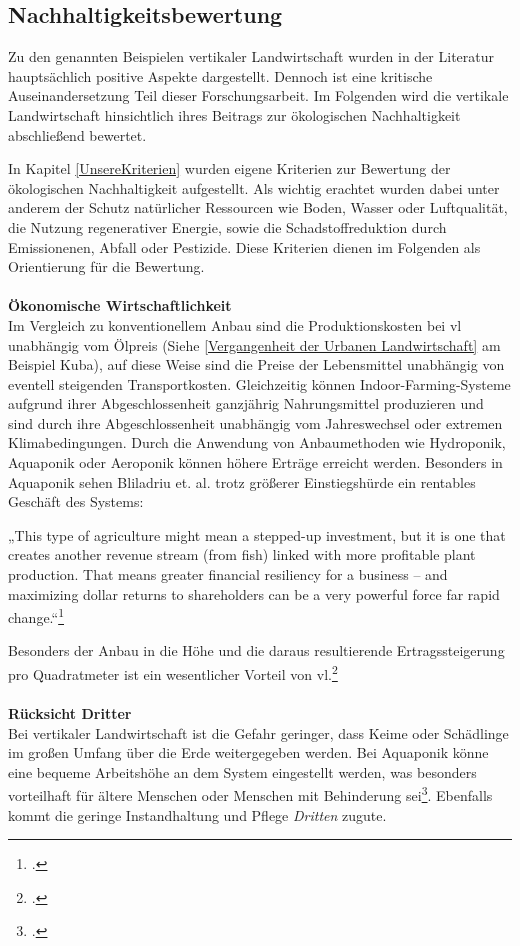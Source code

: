 \documentclass{scrartcl}
\begin{document}
\subsection{Nachhaltigkeitsbewertung}
Zu den genannten Beispielen vertikaler Landwirtschaft wurden in der Literatur hauptsächlich positive Aspekte dargestellt. Dennoch ist eine kritische Auseinandersetzung Teil dieser Forschungsarbeit. Im Folgenden wird die vertikale Landwirtschaft hinsichtlich ihres Beitrags zur ökologischen Nachhaltigkeit abschließend bewertet.

In Kapitel \ref{UnsereKriterien} wurden eigene Kriterien zur Bewertung der ökologischen Nachhaltigkeit aufgestellt. Als wichtig erachtet wurden dabei unter anderem der Schutz natürlicher Ressourcen wie Boden, Wasser oder Luftqualität, die Nutzung regenerativer Energie, sowie die Schadstoffreduktion durch Emissionenen, Abfall oder Pestizide. Diese Kriterien dienen im Folgenden als Orientierung für die Bewertung.
\\
\\
\textbf{Ökonomische Wirtschaftlichkeit}\\
Im Vergleich zu konventionellem Anbau sind die Produktionskosten bei \acs{vl} unabhängig vom Ölpreis (Siehe \ref{Vergangenheit der Urbanen Landwirtschaft} am Beispiel Kuba), auf diese Weise sind die Preise der Lebensmittel unabhängig von eventell steigenden Transportkosten. Gleichzeitig können Indoor-Farming-Systeme aufgrund ihrer Abgeschlossenheit ganzjährig Nahrungsmittel produzieren und sind durch ihre Abgeschlossenheit unabhängig vom Jahreswechsel oder extremen Klimabedingungen. Durch die Anwendung von Anbaumethoden wie Hydroponik, Aquaponik oder Aeroponik können höhere Erträge erreicht werden. Besonders in Aquaponik sehen Bliladriu et. al. trotz größerer Einstiegshürde ein rentables Geschäft des Systems:
\begin{displayquote}
„This type of agriculture might mean a stepped-up investment, but it is one that creates another revenue stream (from fish) linked with more profitable plant production. That means greater financial resiliency for a business – and maximizing dollar returns to shareholders can be a very powerful force far rapid change.“\footcite[Vgl.][S.6]{Blidariu2011NcreasingAquaponics-Review}
\end{displayquote}
Besonders der Anbau in die Höhe und die daraus resultierende Ertragssteigerung pro Quadratmeter ist ein wesentlicher Vorteil von \acs{vl}.\footcite{Despommier2010TheCentury.} \\
\\
\textbf{Rücksicht Dritter}\\
Bei vertikaler Landwirtschaft ist die Gefahr geringer, dass Keime oder Schädlinge im großen Umfang über die Erde weitergegeben werden. Bei Aquaponik könne eine bequeme Arbeitshöhe an dem System eingestellt werden, was besonders vorteilhaft für ältere Menschen oder Menschen mit Behinderung sei\footcite[Vgl.][S.6]{Blidariu2011NcreasingAquaponics-Review}. Ebenfalls kommt die geringe Instandhaltung und Pflege \textit{Dritten} zugute.
\\
\end{document}
